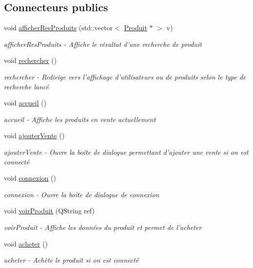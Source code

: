\subsection*{Connecteurs publics}
\begin{DoxyCompactItemize}
\item 
void \hyperlink{class_ma_fenetre_a115348adbe409a24a0d381e1fcc62fe7}{afficher\-Res\-Produits} (std\-::vector$<$ \hyperlink{class_produit}{Produit} $\ast$ $>$ v)
\begin{DoxyCompactList}\small\item\em afficher\-Res\-Produits -\/ Affiche le résultat d'une recherche de produit \end{DoxyCompactList}\item 
void \hyperlink{class_ma_fenetre_a8107c2666807db431962fdcd4e942c69}{rechercher} ()
\begin{DoxyCompactList}\small\item\em rechercher -\/ Redirige vers l'affichage d'utilisateurs ou de produits selon le type de recherche lancé \end{DoxyCompactList}\item 
void \hyperlink{class_ma_fenetre_abc0a097122f161ced271718b254206cd}{accueil} ()
\begin{DoxyCompactList}\small\item\em accueil -\/ Affiche les produits en vente actuellement \end{DoxyCompactList}\item 
void \hyperlink{class_ma_fenetre_abd8cb1d6b536873f3d369457073270c4}{ajouter\-Vente} ()
\begin{DoxyCompactList}\small\item\em ajouter\-Vente -\/ Ouvre la boîte de dialogue permettant d'ajouter une vente si on est connecté \end{DoxyCompactList}\item 
void \hyperlink{class_ma_fenetre_a65270bfc0eeecb1003c6abc9a1199f32}{connexion} ()
\begin{DoxyCompactList}\small\item\em connexion -\/ Ouvre la boîte de dialogue de connexion \end{DoxyCompactList}\item 
void \hyperlink{class_ma_fenetre_ade3a46e2b308936d934503a88275495a}{voir\-Produit} (Q\-String ref)
\begin{DoxyCompactList}\small\item\em voir\-Produit -\/ Affiche les données du produit et permet de l'acheter \end{DoxyCompactList}\item 
void \hyperlink{class_ma_fenetre_a44eae809341ad4816d8ca151d9b703fb}{acheter} ()
\begin{DoxyCompactList}\small\item\em acheter -\/ Achète le produit si on est connecté \end{DoxyCompactList}\end{DoxyCompactItemize}
